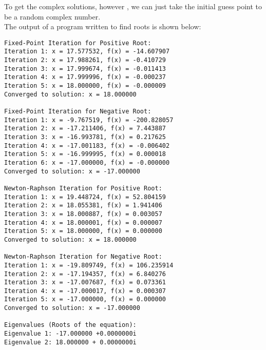 \documentclass[journal]{IEEEtran}
\begin{document}
To get the complex solutions, however , we can just take the initial guess point to be a 
random complex number.\\
The output of a program written to find roots is shown below:
\begin{verbatim}
Fixed-Point Iteration for Positive Root:
Iteration 1: x = 17.577532, f(x) = -14.607907
Iteration 2: x = 17.988261, f(x) = -0.410729
Iteration 3: x = 17.999674, f(x) = -0.011413
Iteration 4: x = 17.999996, f(x) = -0.000237
Iteration 5: x = 18.000000, f(x) = -0.000009
Converged to solution: x = 18.000000

Fixed-Point Iteration for Negative Root:
Iteration 1: x = -9.767519, f(x) = -200.828057
Iteration 2: x = -17.211406, f(x) = 7.443887
Iteration 3: x = -16.993781, f(x) = 0.217625
Iteration 4: x = -17.001183, f(x) = -0.006402
Iteration 5: x = -16.999995, f(x) = 0.000018
Iteration 6: x = -17.000000, f(x) = -0.000000
Converged to solution: x = -17.000000

Newton-Raphson Iteration for Positive Root:
Iteration 1: x = 19.448724, f(x) = 52.804159
Iteration 2: x = 18.055381, f(x) = 1.941406
Iteration 3: x = 18.000887, f(x) = 0.003057
Iteration 4: x = 18.000001, f(x) = 0.000007
Iteration 5: x = 18.000000, f(x) = 0.000000
Converged to solution: x = 18.000000

Newton-Raphson Iteration for Negative Root:
Iteration 1: x = -19.809749, f(x) = 106.235914
Iteration 2: x = -17.194357, f(x) = 6.840276
Iteration 3: x = -17.007687, f(x) = 0.073361
Iteration 4: x = -17.000017, f(x) = 0.000307
Iteration 5: x = -17.000000, f(x) = 0.000000
Converged to solution: x = -17.000000

Eigenvalues (Roots of the equation):
Eigenvalue 1: -17.000000 +0.0000000i
Eigenvalue 2: 18.000000 + 0.0000000i
\end{verbatim}
\end{document}
